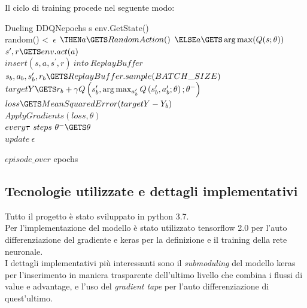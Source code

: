 \documentclass{article}
\begin{document}
		Il ciclo di training procede nel seguente modo:

		\begin{pseudocode}{Dueling DDQN}{epochs}
			\REPEAT
				s \GETS env.GetState() \\
				\REPEAT
					\IF random() <\ $\epsilon$
					$\THEN a \GETS RandomAction()$
					$\ELSE a \GETS \arg \max(Q(s; \theta))$ \\

					$s^{\prime}, r \GETS env.act(a)$ \\
					$insert (s, a, s^{\prime}, r)\ into\ ReplayBuffer$ \\

					$s_{b}, a_{b}, s_{b}^{\prime}, r_{b} \GETS ReplayBuffer.sample(BATCH\_SIZE)$ \\
					$targetY \GETS r_{b} + \gamma Q\left(s_{b}^{\prime}, \arg \max _{a_{b}^{\prime}} Q\left(s_{b}^{\prime}, a_{b}^{\prime} ; \theta\right) ; \theta^{-}\right)$ \\
					$loss \GETS MeanSquaredError(targetY - Y_{b})$ \\
					$ApplyGradients(loss, \theta)$ \\

					$every \tau\ steps\ \theta^{-} \GETS \theta$ \\
					$update\ \epsilon$

				\UNTIL $episode\_over$
			\UNTIL epochs
		\end{pseudocode}

	\subsection{Tecnologie utilizzate e dettagli implementativi}
		Tutto il progetto è stato sviluppato in python 3.7. \\
		Per l'implementazione del modello è stato utilizzato tensorflow 2.0 per l'auto differenziazione del gradiente e keras per la definizione e il training della rete neuronale. \\
		I dettagli implementativi più interessanti sono il \textit{submoduling} del modello keras per l'inserimento in maniera trasparente dell'ultimo livello che combina i flussi di value e advantage, e l'uso del \textit{gradient tape} per l'auto differenziazione di quest'ultimo. \\
\end{document}
